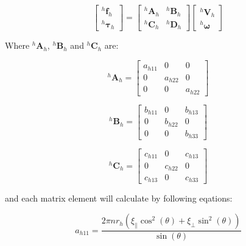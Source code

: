 \documentclass[12pt,a4paper,titlepage]{report}
\begin{document}
\[
\begin{bmatrix} ^{h}\bm{f}_h\\ 
^{h}\bm{\tau}_h\end{bmatrix}  = \begin{bmatrix} ^{h}\bm{A}_h & ^{h}\bm{B}_h \\ 
^{h}\bm{C}_h & ^{h}\bm{D}_h \end{bmatrix}  \begin{bmatrix} ^{h}\bm{V}_h
 \\ ^{h}\bm{\omega}
\end{bmatrix}
\]


Where $^{h}\bm{A}_h$, $^{h}\bm{B}_h$ and $^{h}\bm{C}_h$ are:

\begin{equation}
 ^{h}\bm{A}_h = \begin{bmatrix}
       a_{h11}  & 0 		 & 0           \\[0.3em]
       0		 & a_{h22}           & 0\\[0.3em]
       0           	& 0 		& a_{h22}
     \end{bmatrix}
\label{Amatrix}
\end{equation}


\begin{equation}
 ^{h}\bm{B}_h = \begin{bmatrix}
       b_{h11}  & 0 		 & b_{h13}          \\[0.3em]
       0		 & b_{h22}           & 0\\[0.3em]
       0           	& 0 		& b_{h33}
     \end{bmatrix}
\label{Bmatrix}
\end{equation}



\begin{equation}
 ^{h}\bm{C}_h = \begin{bmatrix}
       c_{h11}  & 0 		 & c_{h13}            \\[0.3em]
       0		 & c_{h22}           & 0\\[0.3em]
       c_{h13}            	& 0 		& c_{h33} 
     \end{bmatrix}
\label{Cmatrix}
\end{equation}


and each matrix element will calculate by following eqations:



\begin{equation}
a_{h11} = \frac{2\pi n r_h (\xi_{\parallel} \cos^2(\theta) + \xi_{\perp} \sin^2(\theta))}{\sin(\theta) }
\label{ah11}
\end{equation} 
\end{document}
